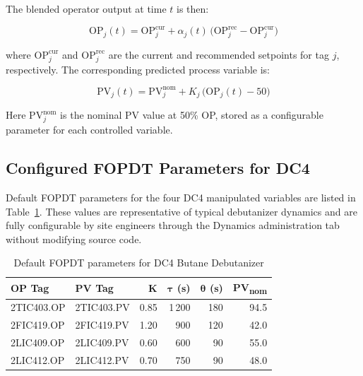 The blended operator output at time $t$ is then:

\begin{equation}
  \mathrm{OP}_j(t) = \mathrm{OP}_j^{\mathrm{cur}}
                   + \alpha_j(t)\,\bigl(\mathrm{OP}_j^{\mathrm{rec}}
                                        - \mathrm{OP}_j^{\mathrm{cur}}\bigr)
  \label{eq:fopdt_blend}
\end{equation}

where $\mathrm{OP}_j^{\mathrm{cur}}$ and $\mathrm{OP}_j^{\mathrm{rec}}$ are
the current and recommended setpoints for tag $j$, respectively.  The
corresponding predicted process variable is:

\begin{equation}
  \mathrm{PV}_j(t) = \mathrm{PV}_j^{\mathrm{nom}}
                   + K_j\,\bigl(\mathrm{OP}_j(t) - 50\bigr)
  \label{eq:fopdt_pv}
\end{equation}

Here $\mathrm{PV}_j^{\mathrm{nom}}$ is the nominal PV value at 50\% OP,
stored as a configurable parameter for each controlled variable.

\subsection{Configured FOPDT Parameters for DC4}

Default FOPDT parameters for the four DC4 manipulated variables are listed
in Table~\ref{tab:fopdt_params}.  These values are representative of typical
debutanizer dynamics and are fully configurable by site engineers through
the Dynamics administration tab without modifying source code.

\begin{table}[h!]
\centering
\caption{Default FOPDT parameters for DC4 Butane Debutanizer}
\label{tab:fopdt_params}
\begin{tabular}{llrrrr}
\hline
\textbf{OP Tag} & \textbf{PV Tag} & \textbf{K} & $\boldsymbol{\tau}$ (s)
  & $\boldsymbol{\theta}$ (s) & \textbf{PV\textsubscript{nom}} \\
\hline
2TIC403.OP & 2TIC403.PV & 0.85 & 1\,200 & 180 & 94.5 \\
2FIC419.OP & 2FIC419.PV & 1.20 & 900  & 120 & 42.0 \\
2LIC409.OP & 2LIC409.PV & 0.60 & 600  &  90 & 55.0 \\
2LIC412.OP & 2LIC412.PV & 0.70 & 750  &  90 & 48.0 \\
\hline
\end{tabular}
\end{table}

